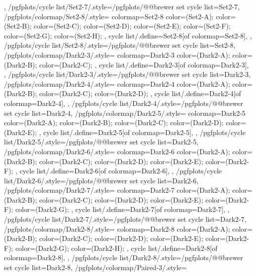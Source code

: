 {{  },
  /pgfplots/cycle list/Set2-7/.style={/pgfplots/@@brewer set cycle list={Set2-7}},
  /pgfplots/colormap/Set2-8/.style={
    colormap={Set2-8}{
      color=(Set2-A);
      color=(Set2-B);
      color=(Set2-C);
      color=(Set2-D);
      color=(Set2-E);
      color=(Set2-F);
      color=(Set2-G);
      color=(Set2-H);
    },
    cycle list/.define={Set2-8}{[of colormap=Set2-8]},
  },
  /pgfplots/cycle list/Set2-8/.style={/pgfplots/@@brewer set cycle list={Set2-8}},
  /pgfplots/colormap/Dark2-3/.style={
    colormap={Dark2-3}{
      color=(Dark2-A);
      color=(Dark2-B);
      color=(Dark2-C);
    },
    cycle list/.define={Dark2-3}{[of colormap=Dark2-3]},
  },
  /pgfplots/cycle list/Dark2-3/.style={/pgfplots/@@brewer set cycle list={Dark2-3}},
  /pgfplots/colormap/Dark2-4/.style={
    colormap={Dark2-4}{
      color=(Dark2-A);
      color=(Dark2-B);
      color=(Dark2-C);
      color=(Dark2-D);
    },
    cycle list/.define={Dark2-4}{[of colormap=Dark2-4]},
  },
  /pgfplots/cycle list/Dark2-4/.style={/pgfplots/@@brewer set cycle list={Dark2-4}},
  /pgfplots/colormap/Dark2-5/.style={
    colormap={Dark2-5}{
      color=(Dark2-A);
      color=(Dark2-B);
      color=(Dark2-C);
      color=(Dark2-D);
      color=(Dark2-E);
    },
    cycle list/.define={Dark2-5}{[of colormap=Dark2-5]},
  },
  /pgfplots/cycle list/Dark2-5/.style={/pgfplots/@@brewer set cycle list={Dark2-5}},
  /pgfplots/colormap/Dark2-6/.style={
    colormap={Dark2-6}{
      color=(Dark2-A);
      color=(Dark2-B);
      color=(Dark2-C);
      color=(Dark2-D);
      color=(Dark2-E);
      color=(Dark2-F);
    },
    cycle list/.define={Dark2-6}{[of colormap=Dark2-6]},
  },
  /pgfplots/cycle list/Dark2-6/.style={/pgfplots/@@brewer set cycle list={Dark2-6}},
  /pgfplots/colormap/Dark2-7/.style={
    colormap={Dark2-7}{
      color=(Dark2-A);
      color=(Dark2-B);
      color=(Dark2-C);
      color=(Dark2-D);
      color=(Dark2-E);
      color=(Dark2-F);
      color=(Dark2-G);
    },
    cycle list/.define={Dark2-7}{[of colormap=Dark2-7]},
  },
  /pgfplots/cycle list/Dark2-7/.style={/pgfplots/@@brewer set cycle list={Dark2-7}},
  /pgfplots/colormap/Dark2-8/.style={
    colormap={Dark2-8}{
      color=(Dark2-A);
      color=(Dark2-B);
      color=(Dark2-C);
      color=(Dark2-D);
      color=(Dark2-E);
      color=(Dark2-F);
      color=(Dark2-G);
      color=(Dark2-H);
    },
    cycle list/.define={Dark2-8}{[of colormap=Dark2-8]},
  },
  /pgfplots/cycle list/Dark2-8/.style={/pgfplots/@@brewer set cycle list={Dark2-8}},
  /pgfplots/colormap/Paired-3/.style={
}}
